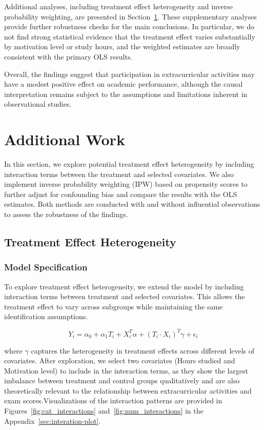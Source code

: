 \documentclass[10pt,letterpaper]{article}
\begin{document}
Additional analyses, including treatment effect heterogeneity and inverse probability weighting, are presented in Section~\ref{sec:additional-work}. These supplementary analyses provide further robustness checks for the main conclusions. In particular, we do not find strong statistical evidence that the treatment effect varies substantially by motivation level or study hours, and the weighted estimates are broadly consistent with the primary OLS results.

Overall, the findings suggest that participation in extracurricular activities may have a modest positive effect on academic performance, although the causal interpretation remains subject to the assumptions and limitations inherent in observational studies.


\newpage
\section{Additional Work}\label{sec:additional-work}

In this section, we explore potential treatment effect heterogeneity by including interaction terms between the treatment and selected covariates. We also implement inverse probability weighting (IPW) based on propensity scores to further adjust for confounding bias and compare the results with the OLS estimates. Both methods are conducted with and without influential observations to assess the robustness of the findings.

\subsection{Treatment Effect Heterogeneity}

\subsubsection{Model Specification}

To explore treatment effect heterogeneity, we extend the model by including interaction terms between treatment and selected covariates. This allows the treatment effect to vary across subgroups while maintaining the same identification assumptions.


\begin{equation*}
Y_i = \alpha_0 + \alpha_1 T_i + X_i^T \alpha + (T_i \cdot X_i)^T \gamma + \epsilon_i
\end{equation*}

where $\gamma$ captures the heterogeneity in treatment effects across different levels of covariates. After exploration, we select two covariates (Hours studied and Motivation level) to include in the interaction terms, as they show the largest imbalance between treatment and control groups qualitatively and are also theoretically relevant to the relationship between extracurricular activities and exam scores.Visualizations of the interaction patterns are provided in Figures~\ref{fig:cat_interactions} and~\ref{fig:num_interactions} in the Appendix~\ref{sec:interation-plot}. 
\end{document}
